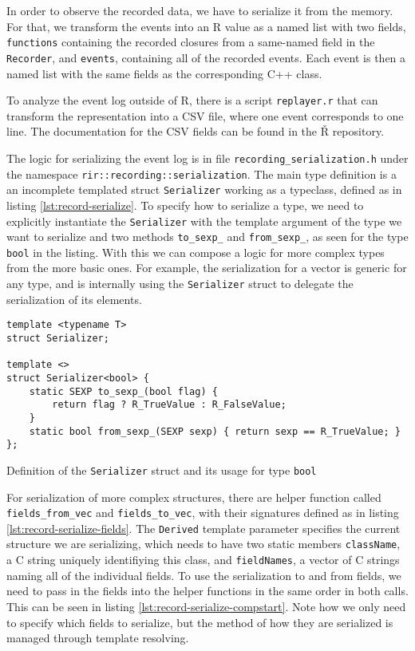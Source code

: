 In order to observe the recorded data, we have to serialize it from the memory. For that, we transform the events into an R value as a named list with two fields, \texttt{functions} containing the recorded closures from a same-named field in the \texttt{Recorder}, and \texttt{events}, containing all of the recorded events. Each event is then a named list with the same fields as the corresponding C++ class.

To analyze the event log outside of R, there is a script \texttt{replayer.r} that can transform the representation into a CSV file, where one event corresponds to one line. The documentation for the CSV fields can be found in the Ř repository\cite[documentation/recording.md]{rsh-github}.

The logic for serializing the event log is in file \texttt{recording\_serialization.h} under the namespace \texttt{rir::recording::serialization}. The main type definition is a an incomplete templated struct \texttt{Serializer} working as a typeclass, defined as in listing \ref{lst:record-serialize}. To specify how to serialize a type, we need to explicitly instantiate the \texttt{Serializer} with the template argument of the type we want to serialize and two methods \texttt{to\_sexp\_} and \texttt{from\_sexp\_}, as seen for the type \texttt{bool} in the listing. With this we can compose a logic for more complex types from the more basic ones. For example, the serialization for a vector is generic for any type, and is internally using the \texttt{Serializer} struct to delegate the serialization of its elements.

\begin{listing}
	\begin{verbatim}
template <typename T>
struct Serializer;

template <>
struct Serializer<bool> {
    static SEXP to_sexp_(bool flag) {
        return flag ? R_TrueValue : R_FalseValue;
    }
    static bool from_sexp_(SEXP sexp) { return sexp == R_TrueValue; }
};
  \end{verbatim}
	\caption{Definition of the \texttt{Serializer} struct and its usage for type \texttt{bool}}\label{lst:record-serialize}
\end{listing}

For serialization of more complex structures, there are helper function called \texttt{fields\_from\_vec} and \texttt{fields\_to\_vec}, with their signatures defined as in listing \ref{lst:record-serialize-fields}. The \texttt{Derived} template parameter specifies the current structure we are serializing, which needs to have two static members \texttt{className}, a C string uniquely identifiying this class, and \texttt{fieldNames}, a vector of C strings naming all of the individual fields. To use the serialization to and from fields, we need to pass in the fields into the helper functions in the same order in both calls. This can be seen in listing \ref{lst:record-serialize-compstart}. Note how we only need to specify which fields to serialize, but the method of how they are serialized is managed through template resolving.

